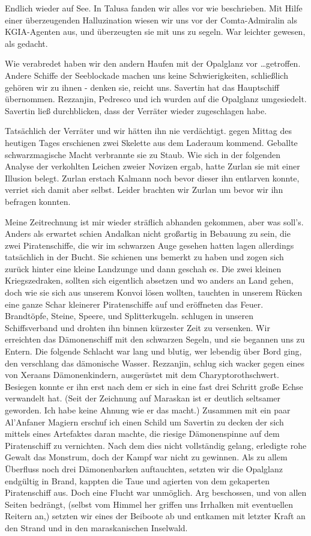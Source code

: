 Endlich wieder auf See. In Talusa fanden wir alles vor wie beschrieben. Mit Hilfe einer überzeugenden Halluzination wiesen wir uns vor der Comta-Admiralin als KGIA-Agenten aus, und überzeugten sie mit uns zu segeln. War leichter gewesen, als gedacht.

Wie verabredet haben wir den andern Haufen mit der Opalglanz vor \dots getroffen. Andere Schiffe der Seeblockade machen uns keine Schwierigkeiten, schließlich gehören wir zu ihnen - denken sie, reicht uns.
Savertin hat das Hauptschiff übernommen. Rezzanjin, Pedresco und ich wurden auf die Opalglanz umgesiedelt. Savertin ließ durchblicken, dass der Verräter wieder zugeschlagen habe.

Tatsächlich der Verräter und wir hätten ihn nie verdächtigt. gegen Mittag des heutigen Tages erschienen zwei Skelette aus dem Laderaum kommend. Geballte schwarzmagische Macht verbrannte sie zu Staub. Wie sich in der folgenden Analyse der verkohlten Leichen zweier Novizen ergab, hatte Zurlan sie mit einer Illusion belegt. Zurlan erstach Kalmann noch bevor dieser ihn entlarven konnte, verriet sich damit aber selbst. Leider brachten wir Zurlan um bevor wir ihn befragen konnten.

Meine Zeitrechnung ist mir wieder sträflich abhanden gekommen, aber was soll's. Anders als erwartet schien Andalkan nicht großartig in Bebauung zu sein, die zwei Piratenschiffe, die wir im schwarzen Auge gesehen hatten lagen allerdings tatsächlich in der Bucht. Sie schienen uns bemerkt zu haben und zogen sich zurück hinter eine kleine Landzunge und dann geschah es. Die zwei kleinen Kriegszedraken, sollten sich eigentlich absetzen und wo anders an Land gehen, doch wie sie sich aus unserem Konvoi lösen wollten, tauchten in unserem Rücken eine ganze Schar kleinerer Piratenschiffe auf und eröffneten das Feuer. Brandtöpfe, Steine, Speere, und Splitterkugeln. schlugen in unseren Schiffsverband und drohten ihn binnen kürzester Zeit zu versenken. Wir erreichten das Dämonenschiff mit den schwarzen Segeln, und sie begannen uns zu Entern. Die folgende Schlacht war lang und blutig, wer lebendig über Bord ging, den verschlang das dämonische Wasser. Rezzanjin, schlug sich wacker gegen eines von Xeraans Dämonenkindern, ausgerüstet mit dem Charyptorothschwert. Besiegen konnte er ihn erst nach dem er sich in eine fast drei Schritt große Echse verwandelt hat. (Seit der Zeichnung auf Maraskan ist er deutlich seltsamer geworden. Ich habe keine Ahnung wie er das macht.) Zusammen mit ein paar Al'Anfaner Magiern erschuf ich einen Schild um Savertin zu decken der sich mittels eines Artefaktes daran machte, die riesige Dämonenspinne auf dem Piratenschiff zu vernichten. Nach dem dies nicht vollständig gelang, erledigte rohe Gewalt das Monstrum, doch der Kampf war nicht zu gewinnen. Als zu allem Überfluss noch drei Dämonenbarken auftauchten, setzten wir die Opalglanz endgültig in Brand, kappten die Taue und agierten von dem gekaperten Piratenschiff aus. Doch eine Flucht war unmöglich. Arg beschossen, und von allen Seiten bedrängt, (selbst vom Himmel her griffen uns Irrhalken mit eventuellen Reitern an,) setzten wir eines der Beiboote ab und entkamen mit letzter Kraft an den Strand und in den maraskanischen Inselwald.

